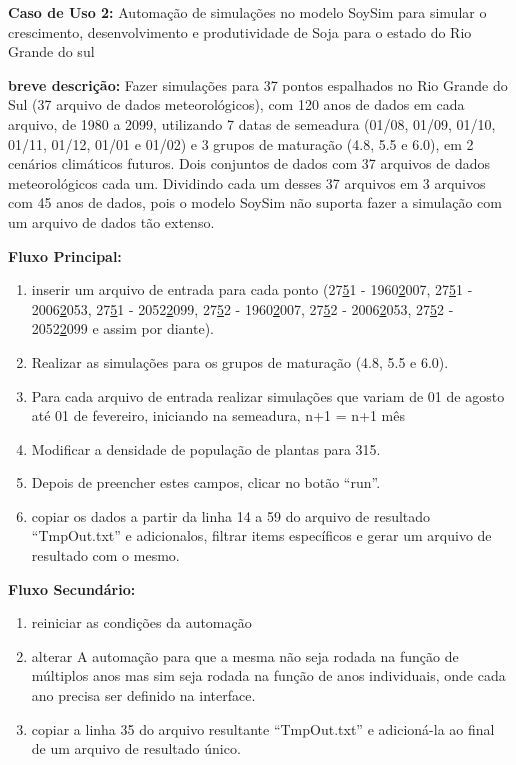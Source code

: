 \documentclass[12pt]{article}
\begin{document}
	{\bf Caso de Uso 2:} Automação de simulações no modelo SoySim para simular o crescimento, desenvolvimento e produtividade de Soja para o estado do Rio Grande do sul
	\bigskip
	
	{\bf breve descrição:} Fazer simulações para 37 pontos espalhados no Rio Grande do Sul (37 arquivo de dados meteorológicos), com 120 anos de dados em cada arquivo, de 1980 a 2099, utilizando 7 datas de semeadura (01/08, 01/09, 01/10, 01/11, 01/12, 01/01 e 01/02) e 3 grupos de maturação (4.8, 5.5 e 6.0), em 2 cenários climáticos futuros. Dois conjuntos de dados com 37 arquivos de dados meteorológicos cada um. Dividindo cada um desses 37 arquivos em 3 arquivos com 45 anos de dados, pois o modelo SoySim não suporta fazer a simulação com um arquivo de dados tão extenso.
	\bigskip
	
	{\bf Fluxo Principal:}
	
	\begin{enumerate}
		\item inserir um arquivo de entrada para cada ponto (27\underline51 - 1960\underline2007, 27\underline51 - 2006\underline2053, 27\underline51 - 2052\underline2099, 27\underline52 - 1960\underline2007, 27\underline52 - 2006\underline2053, 27\underline52 - 2052\underline2099 e assim por diante).
		\item Realizar as simulações para os grupos de maturação (4.8, 5.5 e 6.0).
		\item Para cada arquivo de entrada realizar simulações que variam de 01 de agosto até 01 de fevereiro, iniciando na semeadura, n+1 = n+1 mês
		\item Modificar a densidade de população de plantas para 315.
		\item Depois de preencher estes campos, clicar no botão “run”.
		\item copiar os dados a partir da linha 14 a 59 do arquivo de resultado “TmpOut.txt” e adicionalos, filtrar items específicos e gerar um arquivo de resultado com o mesmo.
	\end{enumerate}
	
	{\bf Fluxo Secundário:}
	
	\begin{enumerate}
		\item reiniciar as condições da automação
		\item alterar A automação para que a mesma não seja rodada na função de múltiplos anos mas sim seja rodada na função de anos individuais, onde cada ano precisa ser definido na interface.
		\item  copiar a linha 35 do arquivo resultante “TmpOut.txt” e adicioná-la ao final de um arquivo de resultado único.
	\end{enumerate}
	
\end{document}
